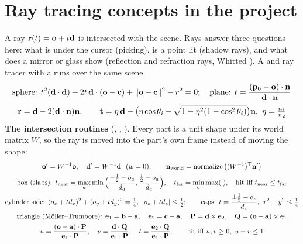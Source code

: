 \section{Ray tracing concepts in the project}
\label{sec:rt}
A ray $\mathbf{r}(t)=\mathbf{o}+t\mathbf{d}$ is intersected with the scene. Rays answer three questions here: what is
under the cursor (picking), is a point lit (shadow rays), and what does a mirror or glass show (reflection and
refraction rays, Whitted \cite{whitted1980}). A  and  ray tracer with a  runs over the same scene.
\begin{equation}
\text{sphere: } t^2(\mathbf{d}\cdot\mathbf{d})+2t\,\mathbf{d}\cdot(\mathbf{o}-\mathbf{c})+\lVert\mathbf{o}-\mathbf{c}\rVert^2-r^2=0;\quad
\text{plane: } t=\frac{(\mathbf{p}_0-\mathbf{o})\cdot\mathbf{n}}{\mathbf{d}\cdot\mathbf{n}}
\label{eq:rays}
\end{equation}
\begin{equation}
\vect r=\vect d-2(\vect d\cdot\vect n)\vect n,\qquad
\vect t=\eta\,\vect d+\big(\eta\cos\theta_i-\sqrt{1-\eta^2(1-\cos^2\theta_i)}\big)\vect n,\ \eta=\tfrac{n_1}{n_2}
\label{eq:reflref}
\end{equation}
\textbf{The intersection routines} (, , ). Every part is
a unit shape under its world matrix $W$, so the ray is moved into the part's own frame instead of moving the shape:
\begin{gather}
\vect o'=W^{-1}\vect o,\quad \vect d'=W^{-1}\vect d\ \ (w=0),\qquad \vect n_{\text{world}}=\operatorname{normalize}\big((W^{-1})^\top\vect n'\big)\label{eq:rtobj}\\
\text{box (slabs): } t_{\text{near}}=\max_a\min\Big(\frac{-\frac12-o_a}{d_a},\frac{\frac12-o_a}{d_a}\Big),\quad
t_{\text{far}}=\min_a\max(\cdot),\quad \text{hit iff } t_{\text{near}}\le t_{\text{far}}\nonumber\\
\text{cylinder side: } (o_x+td_x)^2+(o_y+td_y)^2=\tfrac14,\ |o_z+td_z|\le\tfrac12;\qquad
\text{caps: } t=\frac{\pm\frac12-o_z}{d_z},\ x^2+y^2\le\tfrac14\nonumber\\
\text{triangle (M\"oller--Trumbore): } \vect e_1=\vect b-\vect a,\quad \vect e_2=\vect c-\vect a,\quad \vect P=\vect d\times\vect e_2,\quad \vect Q=(\vect o-\vect a)\times\vect e_1\nonumber\\
u=\frac{(\vect o-\vect a)\cdot\vect P}{\vect e_1\cdot\vect P},\quad v=\frac{\vect d\cdot\vect Q}{\vect e_1\cdot\vect P},\quad
t=\frac{\vect e_2\cdot\vect Q}{\vect e_1\cdot\vect P},\qquad\text{hit iff } u,v\ge0,\ u+v\le1\nonumber
\end{gather}
